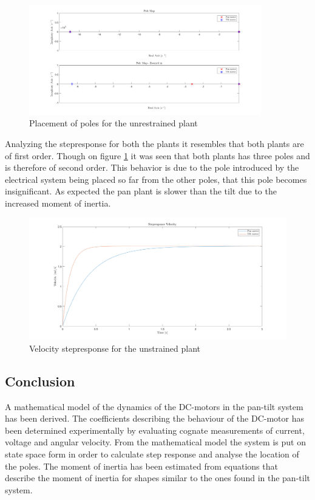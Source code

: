 \documentclass[../../main.tex]{subfiles}
\begin{document}
\begin{figure}
    \centering
    \includegraphics[width = 0.9\textwidth]{Sections/System_Modelling/Images/polesPlant.png}
    \caption{Placement of poles for the unrestrained plant}
    \label{fig:polesPlant}
\end{figure}

Analyzing the stepresponse for both the plants it resembles that both plants are of first order. Though on figure \ref{fig:polesPlant} it was seen that both plants has three poles and is therefore of second order. This behavior is due to the pole introduced by the electrical system being placed so far from the other poles, that this pole becomes insignificant. As expected the pan plant is slower than the tilt due to the increased moment of inertia.  
 

\begin{figure}
    \centering
    \includegraphics[width = 0.9 \textwidth]{Sections/System_Modelling/Images/stepResponseVelPlant.png}
    \caption{Velocity stepresponse for the unstrained plant}
    \label{fig:StepVelPlant}
\end{figure}



\subsection{Conclusion}

A mathematical model of the dynamics of the DC-motors in the pan-tilt system has been derived. The coefficients describing the behaviour of the DC-motor has been determined experimentally by evaluating cognate measurements of current, voltage and angular velocity. From the mathematical model the system is put on state space form in order to calculate step response and analyse the location of the poles.  The moment of inertia has been estimated from equations that describe the moment of inertia for shapes similar to the ones found in the pan-tilt system. 
\end{document}
